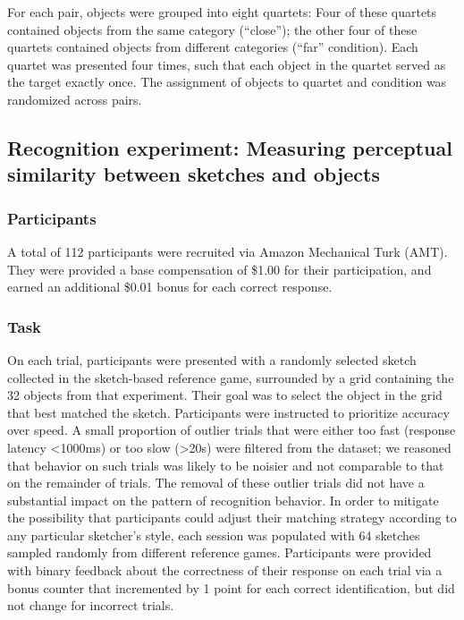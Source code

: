 \documentclass[9pt,twocolumn,twoside]{pnas-new}
\begin{document}
{For each pair, objects were grouped into eight quartets: Four of these quartets contained objects from the same category (``close''); the other four of these quartets contained objects from different categories (``far'' condition). Each quartet was presented four times, such that each object in the quartet served as the target exactly once. The assignment of objects to quartet and condition was randomized across pairs.

\subsection*{Recognition experiment: Measuring perceptual similarity between sketches and objects}

\subsubsection*{Participants}

A total of 112 participants were recruited via Amazon Mechanical Turk (AMT). They were provided a base compensation of \$1.00 for their participation, and earned an additional \$0.01 bonus for each correct response.

\subsubsection*{Task}

On each trial, participants were presented with a randomly selected sketch collected in the sketch-based reference game, surrounded by a grid containing the 32 objects from that experiment. Their goal was to select the object in the grid that best matched the sketch. Participants were instructed to prioritize accuracy over speed. A small proportion of outlier trials that were either too fast (response latency <1000ms) or too slow (>20s) were filtered from the dataset; we reasoned that behavior on such trials was likely to be noisier and not comparable to that on the remainder of trials. The removal of these outlier trials did not have a substantial impact on the pattern of recognition behavior. In order to mitigate the possibility that participants could adjust their matching strategy according to any particular sketcher's style, each session was populated with 64 sketches sampled randomly from different reference games. Participants were provided with binary feedback about the correctness of their response on each trial via a bonus counter that incremented by 1 point for each correct identification, but did not change for incorrect trials.

}
\end{document}
